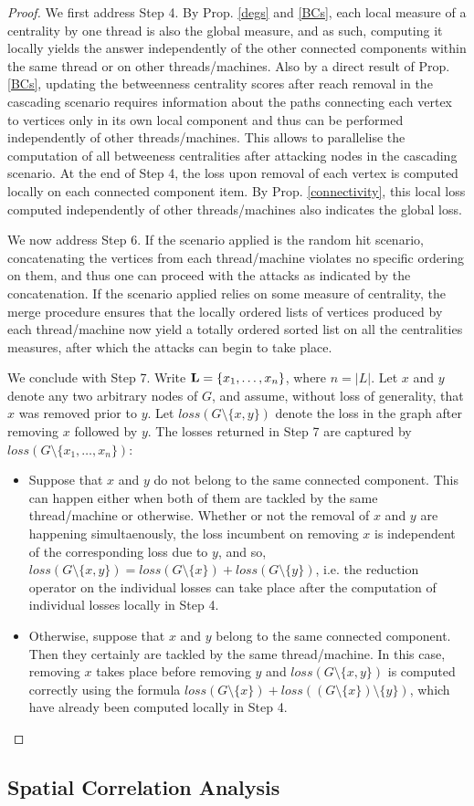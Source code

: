 \begin{proof}
We first address Step 4. By Prop. \ref{degs} and \ref{BCs}, each local measure of a centrality by one thread is also the global measure, and as such, computing it locally yields the answer independently of the other connected components within the same thread or on other threads/machines. Also by a direct result of Prop. \ref{BCs}, updating the betweenness centrality scores after reach removal in the cascading scenario requires information about the paths connecting each vertex to vertices only in its own local component and thus can be performed independently of other threads/machines. This allows to parallelise the computation of all betweeness centralities after attacking nodes in the cascading scenario. At the end of Step 4, the loss upon removal of each vertex is computed locally on each connected component item. By Prop. \ref{connectivity}, this local loss computed independently of other threads/machines also indicates the global loss. 

We now address Step 6. If the scenario applied is the random hit scenario, concatenating the vertices from each thread/machine violates no specific ordering on them, and thus one can proceed with the attacks as indicated by the concatenation. If the scenario applied relies on some measure of centrality, the merge procedure ensures that the locally ordered lists of vertices produced by each thread/machine now yield a totally ordered sorted list on all the centralities measures, after which the attacks can begin to take place.

We conclude with Step 7. Write ${\bf L} = \{x_1,\ldots,x_n\}$, where $n = \left \vert L \right \vert$. Let $x$ and $y$ denote any two arbitrary nodes of $G$, and assume, without loss of generality, that $x$ was removed prior to $y$. Let $loss(G\setminus \{x,y\})$ denote the loss in the graph after removing $x$ followed by $y$. The losses returned in Step 7 are captured by $loss(G\setminus \{x_1,\ldots,x_n\})$:
\begin{itemize}
\item{Suppose that $x$ and $y$ do not belong to the same connected component. This can happen either when both of them are tackled by the same thread/machine or otherwise. Whether or not the removal of $x$ and $y$ are happening simultaenously, the loss incumbent on removing $x$ is independent of the corresponding loss due to $y$, and so, $loss(G\setminus \{x,y\}) = loss (G \setminus \{x\}) + loss (G \setminus \{y\})$, i.e. the reduction operator on the individual losses can take place after the computation of individual losses locally in Step 4.}
\item{Otherwise, suppose that $x$ and $y$ belong to the same connected component. Then they certainly are tackled by the same thread/machine. In this case, removing $x$ takes place before removing $y$ and $loss(G\setminus \{x,y\})$ is computed correctly using the formula $loss(G \setminus \{x\}) + loss \left (\left(G \setminus \{x\}\right)\setminus \{y\}\right)$, which have already been computed locally in Step 4.} 
\end{itemize}
\end{proof}
\subsection{Spatial Correlation Analysis}
